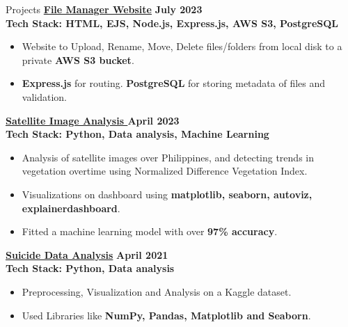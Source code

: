 \documentclass{resume} %
\begin{document}
\begin{rSection}{Projects}
\textbf{\href{https://github.com/ArmanGrewal007/FileManager}{File Manager Website}} \hfill \textbf{July 2023}\\
\textbf{Tech Stack: HTML, EJS, Node.js, Express.js, AWS S3, PostgreSQL}
\vspace{-0.5\baselineskip}
\begin{itemize}[noitemsep, nolistsep]
    \item Website to Upload, Rename, Move, Delete files/folders from local disk to a private \textbf{AWS S3 bucket}.
    \item \textbf{Express.js} for routing. \textbf{PostgreSQL} for storing metadata of files and validation.
\end{itemize}

\textbf{\href{https://github.com/ArmanGrewal007/ndvi_vals}{Satellite Image Analysis
}} \hfill \textbf{April 2023}\\
\textbf{Tech Stack: Python, Data analysis, Machine Learning}
\vspace{-0.5\baselineskip}
\begin{itemize}[noitemsep, nolistsep]
    \item Analysis of satellite images over Philippines, and detecting trends in vegetation overtime using Normalized Difference Vegetation Index. 
    \item Visualizations on dashboard using \textbf{matplotlib, seaborn, autoviz, explainerdashboard}.
    \item Fitted a machine learning model with over \textbf{97\% accuracy}.
\end{itemize}

\textbf{\href{https://github.com/ArmanGrewal007/suicide_pandas}{Suicide Data Analysis}} \hfill \textbf{April 2021}\\
\textbf{Tech Stack: Python, Data analysis}
\vspace{-0.5\baselineskip}
\begin{itemize}[noitemsep, nolistsep]
    \item Preprocessing, Visualization and Analysis on a Kaggle dataset.
    \item Used Libraries like \textbf{NumPy, Pandas, Matplotlib and Seaborn}.
\end{itemize}
\end{rSection}
\end{document}
